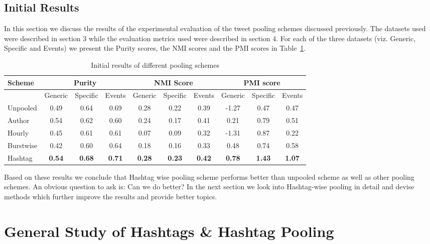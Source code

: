 \documentclass[10pt,a5paper,twoside]{article}
\begin{document}
\subsection{Initial Results}
In this section we discuss the results of the experimental evaluation of the tweet pooling schemes discussed previously. The datasets used were described in section 3 while the evaluation metrics used were described in section 4. For each of the three datasets (viz. Generic, Specific and Events) we present the Purity scores, the NMI scores and the PMI scores in Table~\ref{tbl-456}. 
\\

\begin{table}[!h]
\centering
\resizebox{14cm}{!} 
{
	\begin{tabular}{|l|ccc|ccc|ccc|}
	\hline
	Scheme  & \multicolumn {3}{c|}{Purity} & \multicolumn {3}{c|}{NMI Score} & \multicolumn {3}{c|}{PMI score}\\
	\hline
	 & Generic & Specific & Events &  Generic & Specific & Events &  Generic & Specific & Events\\
	\hline
	Unpooled & 0.49 & 0.64 & 0.69 & 0.28 & 0.22 & 0.39 & -1.27 & 0.47 & 0.47 \\
	\hline
	Author & 0.54 & 0.62 & 0.60 & 0.24 & 0.17 & 0.41 & 0.21 & 0.79 & 0.51 \\
	\hline
	Hourly & 0.45 & 0.61 & 0.61 & 0.07 & 0.09 & 0.32 & -1.31 & 0.87 & 0.22 \\
	\hline
	Burstwise & 0.42 & 0.60 & 0.64 & 0.18 & 0.16 & 0.33 & 0.48 & 0.74 & 0.58 \\
	\hline
	Hashtag & \textbf{0.54} & \textbf{0.68} & \textbf{0.71} & \textbf{0.28} & \textbf{0.23} & \textbf{0.42} & \textbf{0.78} & \textbf{1.43} & \textbf{1.07} \\
	\hline
	\end{tabular}
}
\caption{Initial results of different pooling schemes}\label{tbl-456}
\end{table}




Based on these results we conclude that Hashtag wise pooling scheme performs better than unpooled scheme as well as other pooling schemes. An obvious question to ask is: Can we do better? In the next section we look into Hashtag-wise pooling in detail and devise methods which further improve the results and provide better topics.

\section{General Study of Hashtags \& Hashtag Pooling}
\end{document}
